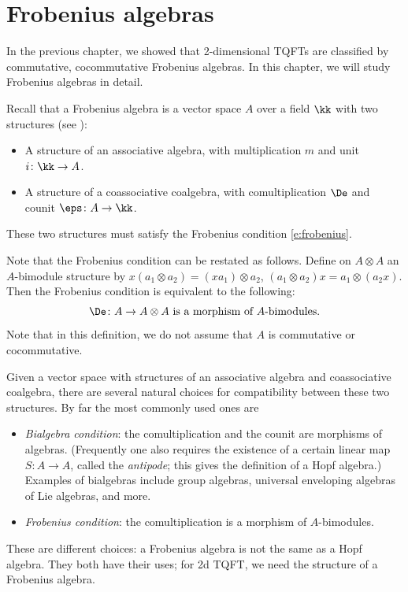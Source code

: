 \chapter{Frobenius algebras}\label{c:frobenius}


In the previous chapter, we showed that 2-dimensional TQFTs are classified
by commutative, cocommutative Frobenius algebras. In this chapter, we will study
Frobenius algebras in detail.


Recall that a Frobenius
algebra is a vector space $A$ over a field $\kk$ with two structures (see
):
\begin{itemize}
  \item A structure of an associative algebra, with multiplication $m$ and
    unit $i\colon \kk \to A$.
  \item A structure of a coassociative coalgebra, with comultiplication $\De$
    and counit $\eps\colon A\to \kk$.
\end{itemize}
These two structures must satisfy the Frobenius condition
\eqref{e:frobenius}.

Note that the Frobenius condition can be restated as follows. Define on
$A\otimes A$ an $A$-bimodule structure by $x (a_1\otimes a_2) = (xa_1)\otimes
a_2$, $(a_1\otimes a_2) x = a_1\otimes (a_2 x)$. Then the Frobenius condition
is equivalent to the following:
\begin{equation}\label{e:frobenius2}
  \De\colon A\to A\otimes A \text{ is a morphism of $A$-bimodules.}
\end{equation}
Note that in this definition, we do not assume that $A$ is commutative or
cocommutative.

\begin{remark}\label{r:bialgebra-vs-frobenius}
  Given a vector space with structures of an associative algebra and
  coassociative coalgebra, there are several natural choices for
  compatibility between these two structures. By far the most commonly used
  ones are
  \begin{itemize}
    \item \emph{Bialgebra condition}:
      the comultiplication and the counit are morphisms of algebras.
      (Frequently one also requires the existence of a certain linear map
      $S\colon A\to A$, called
      the \emph{antipode}; this gives the definition of a Hopf
      algebra.)
      Examples of bialgebras include group algebras, universal
      enveloping algebras of Lie algebras, and more.
    \item \emph{Frobenius condition}: the comultiplication is a morphism
      of $A$-bimodules.
  \end{itemize}
  These are different choices: a Frobenius algebra is not the same as a
  Hopf algebra. They both have their uses; for 2d TQFT, we need the
  structure of a Frobenius algebra.
\end{remark}


